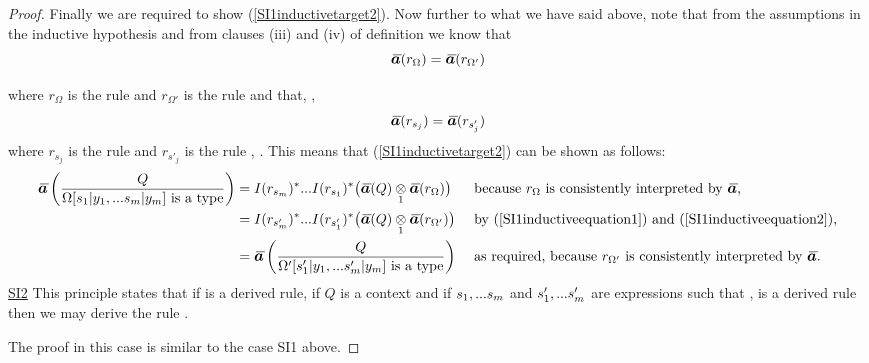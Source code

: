 \begin{proof}
Finally we are required to show  (\ref{SI1inductivetarget2}).
Now further to what we have said above, note that from the assumptions in the inductive hypothesis 
and from clauses (iii) and (iv) of definition  we know that
\begin{equation}
\label{SI1inductiveequation1}
\Ibar(r_\Omega)=\Ibar(r_{\Omega'})
\end{equation}

where $r_\Omega$ is the rule \SIonesourcelhs and $r_{\Omega'}$ is the rule \SIonesourcerhs
and that, \foreachj,
\begin{equation}
\label{SI1inductiveequation2}
\Ibar(r_{s_j})=\Ibar(r_{s'_j})
\end{equation}
where  $r_{s_j}$ is the rule 
and $r_{s'_j}$ is the rule , \foreachj.
This means that (\ref{SI1inductivetarget2}) can be shown as follows:
\begin{align*}
\ibarmappedrule{Q}{\isT{\Omega[\SUBsFORy{m}]}} 
    &=I(r_{s_m})^* ... I(r_{s_1})^*\big( \crossx{\Ibar(Q)}{\Ibar(r_\Omega)}{1} \big)
    &&\mbox{ because $r_\Omega$ is consistently interpreted by $\Ibar$,} \\
    &=I(r_{s'_m})^* ... I(r_{s'_1})^*\big( \crossx{\Ibar(Q)}{\Ibar(r_{\Omega'})}{1} \big)
    &&\mbox{ by (\ref{SI1inductiveequation1}) and (\ref{SI1inductiveequation2}),} \\
    &=\ibarmappedrule{Q}{\isT{\Omega'[\SUBspFORy{m}]}}
    &&\mbox{ as required, because $r_{\Omega'}$ is consistently interpreted by $\Ibar$.}
\end{align*}
\newpage
\underline{SI2} 
\newcommand{\SItwosourcelhs}{\gatdisplayrule{\yOmega{m}}{\ofT{s}{\Omega}}}
\newcommand{\SItwosourcerhs}{\gatdisplayrule{\yOmega{m}}{\ofT{s'}{\Omega'}}}
\newcommand{\SItwoconclusion}{\gatdisplayrule{Q}{s[\SUBsFORy{m}]=s'[\SUBspFORy{m}] \in \Omega[\SUBsFORy{m}]}}
\newcommand{\SItwoconclusionlhs}{\gatdisplayrule{Q}{\ofT{s[\SUBsFORy{m}]}{\Omega[\SUBsFORy{m}]}}}
\newcommand{\SItwoconclusionrhs}{\gatdisplayrule{Q}{\ofT{s'[\SUBspFORy{m}]}{\Omega[\SUBsFORy{m}]}}}
This principle states that if  is a derived rule, 
if $Q$ is a context and if  $s_1,...s_{m}$ and $s'_1,...s'_{m}$ are expressions such that
\foreachj,  is a derived rule then we may derive the rule \SItwoconclusion. 

The proof in this case is similar to the case SI1 above. 


\end{proof}
